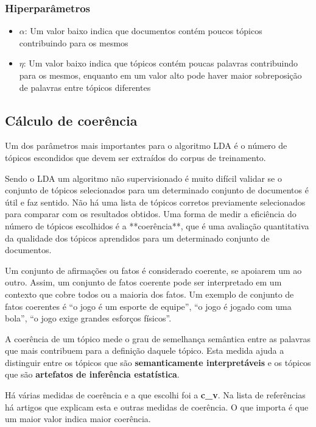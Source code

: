 \subsubsection{Hiperparâmetros}

\begin{itemize}
    \item $\alpha$: Um valor baixo indica que documentos contém poucos tópicos contribuindo para os mesmos
    \item $\eta$: Um valor baixo indica que tópicos contém poucas palavras contribuindo para os mesmos, enquanto em um valor alto pode haver maior sobreposição 
    de palavras entre tópicos diferentes
\end{itemize}

\subsection{Cálculo de coerência}

Um dos parâmetros mais importantes para o algoritmo LDA é o número de tópicos escondidos que devem ser extraídos do corpus de treinamento.

Sendo o LDA um algoritmo não supervisionado é muito difícil validar se o conjunto de tópicos selecionados para um determinado conjunto de documentos
é útil e faz sentido. Não há uma lista de tópicos corretos previamente selecionados para comparar com os resultados obtidos. Uma forma de medir a 
eficiência do número de tópicos escolhidos é a **coerência**, que é uma avaliação quantitativa da qualidade dos tópicos aprendidos para um determinado 
conjunto de documentos.

Um conjunto de afirmações ou fatos é considerado coerente, se apoiarem um ao outro. Assim, um conjunto de fatos coerente pode ser interpretado 
em um contexto que cobre todos ou a maioria dos fatos. Um exemplo de conjunto de fatos coerentes é “o jogo é um esporte de equipe”, 
“o jogo é jogado com uma bola”, “o jogo exige grandes esforços físicos”.

A coerência de um tópico mede o grau de semelhança semântica entre as palavras que mais contribuem para a definição daquele tópico.
Esta medida ajuda a distinguir entre os tópicos que são \textbf{semanticamente interpretáveis} e os tópicos que são 
\textbf{artefatos de inferência estatística}.

Há várias medidas de coerência e a que escolhi foi a \textbf{c\_v}. Na lista de referências há artigos que explicam esta e outras 
medidas de coerência. O que importa é que um maior valor indica maior coerência.

